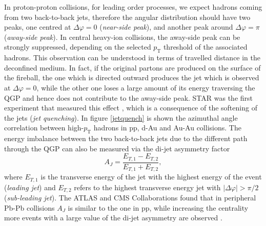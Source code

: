 \documentclass[b5paper,10pt,twoside,oldstyle,classica]{toptesi}
\newcommand{\pt}{p_\text{T}}
\begin{document}
In proton-proton collisions, for leading order processes, we expect hadrons coming from two back-to-back jets, therefore the angular distribution should have two peaks, one centred at $\Delta\varphi = 0$ (\textit{near-side peak}), and another peak around $\Delta\varphi = \pi$ (\textit{away-side peak}).   
In central heavy-ion collisions, the away-side peak can be strongly suppressed, depending on the selected $\pt$ threshold of the associated hadrons.
This observation can be understood in terms of travelled distance in the deconfined medium. In fact, if the original partons are produced on the surface of the fireball, the one which is directed outward produces the jet which is observed at $\Delta\varphi = 0$, while the other one loses a large amount of its energy traversing the QGP and hence does not contribute to the away-side peak. STAR was the first experiment that measured this effect \cite{Adams:2006yt}, which is a consequence of the softening of the jets (\textit{jet quenching}). In figure \ref{jetquench} is shown the azimuthal angle correlation between high-$\pt$ hadrons in pp, d-Au and Au-Au collisions.
The energy imbalance between the two back-to-back jets due to the different path through the QGP can also be measured via the di-jet asymmetry factor
\begin{equation}
 A_J = \frac{E_{T,1}-E_{T,2}}{E_{T,1}+E_{T,2}},
\end{equation}
where $E_{T,1}$ is the transverse energy of the jet with the highest energy of the event (\textit{leading jet}) and $E_{T,2}$ refers to the highest transverse energy jet with $|\Delta\varphi| > \pi/2$ (\textit{sub-leading jet}). The ATLAS and CMS Collaborations found that in peripheral Pb-Pb collisions $A_J$ is similar to the one in pp, while increasing the centrality more events with a large value of the di-jet asymmetry are observed \cite{Aad:2010bu} \cite{Salur:2012ge}. 
\end{document}
